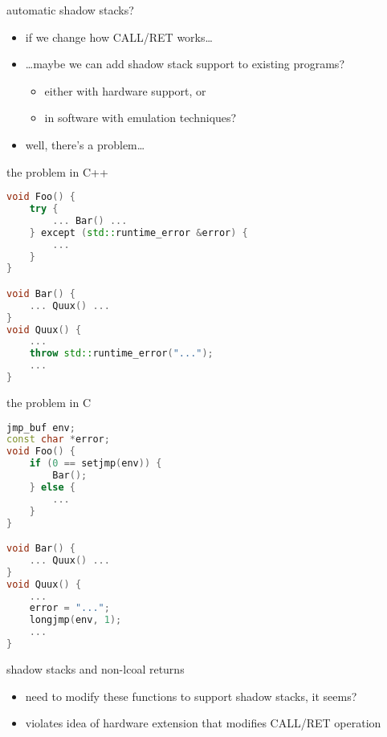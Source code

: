 \usetikzlibrary{arrows.meta,patterns}

\begin{frame}{automatic shadow stacks?}
    \begin{itemize}
    \item if we change how CALL/RET works\ldots
    \item \ldots maybe we can add shadow stack support to existing programs?
    \begin{itemize}
        \item either with hardware support, or
        \item in software with emulation techniques?
        \end{itemize}
    \vspace{.5cm}
    \item well, there's a problem\ldots
    \end{itemize}
\end{frame}


\begin{frame}[fragile,label=noAutomaticStack1]{the problem in C++}
\begin{lstlisting}[language=C++,style=smaller]
void Foo() {
    try {
        ... Bar() ...
    } except (std::runtime_error &error) {
        ...
    }
}

void Bar() {
    ... Quux() ...
}
void Quux() {
    ...
    throw std::runtime_error("...");
    ...
}
\end{lstlisting}    
\end{frame}

\begin{frame}[fragile,label=noAutomaticStack2]{the problem in C}
\begin{lstlisting}[language=C++,style=smaller]
jmp_buf env;
const char *error;
void Foo() {
    if (0 == setjmp(env)) {
        Bar();
    } else {
        ...
    }
}

void Bar() {
    ... Quux() ...
}
void Quux() {
    ...
    error = "...";
    longjmp(env, 1);
    ...
}
\end{lstlisting}    
\end{frame}

\begin{frame}{shadow stacks and non-lcoal returns}
    \begin{itemize}
    \item need to modify these functions to support shadow stacks, it seems?
    \item violates idea of hardware extension that modifies CALL/RET operation
    \end{itemize}
\end{frame}

